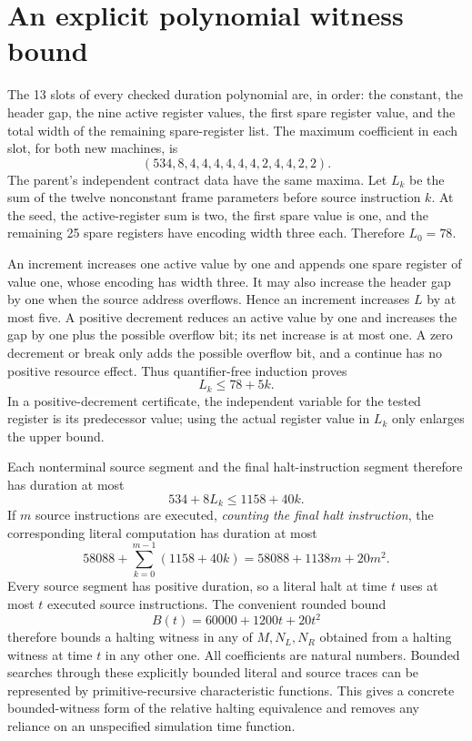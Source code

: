 \section{An explicit polynomial witness bound}

The 13 slots of every checked duration polynomial are, in order: the
constant, the header gap, the nine active register values, the first spare
register value, and the total width of the remaining spare-register list.
The maximum coefficient in each slot, for both new machines, is
\[
 (534,8,4,4,4,4,4,4,2,4,4,2,2).
\]
The parent's independent contract data have the same maxima.  Let $L_k$
be the sum of the twelve nonconstant frame parameters before source
instruction $k$.  At the seed, the active-register sum is two, the first
spare value is one, and the remaining 25 spare registers have encoding
width three each.  Therefore $L_0=78$.

An increment increases one active value by one and appends one spare
register of value one, whose encoding has width three.  It may also
increase the header gap by one when the source address overflows.  Hence
an increment increases $L$ by at most five.  A positive decrement reduces
an active value by one and increases the gap by one plus the possible
overflow bit; its net increase is at most one.  A zero decrement or break
only adds the possible overflow bit, and a continue has no positive
resource effect.  Thus quantifier-free induction proves
\[
 L_k\le78+5k.
\]
In a positive-decrement certificate, the independent variable for the
tested register is its predecessor value; using the actual register value
in $L_k$ only enlarges the upper bound.

Each nonterminal source segment and the final halt-instruction segment
therefore has duration at most
\[
 534+8L_k\le1158+40k.
\]
If $m$ source instructions are executed, \emph{counting the final halt
instruction}, the corresponding literal computation has duration at most
\[
 58088+\sum_{k=0}^{m-1}(1158+40k)
   =58088+1138m+20m^2.
\]
Every source segment has positive duration, so a literal halt at time
$t$ uses at most $t$ executed source instructions.  The convenient rounded
bound
\[
 \boxed{B(t)=60000+1200t+20t^2}
\]
therefore bounds a halting witness in any of $M,N_L,N_R$ obtained from a
halting witness at time $t$ in any other one.  All coefficients are natural
numbers.  Bounded searches through these explicitly bounded literal and
source traces can be represented by primitive-recursive characteristic
functions.  This gives a concrete bounded-witness form of the relative
halting equivalence and removes any reliance on an unspecified simulation
time function.
